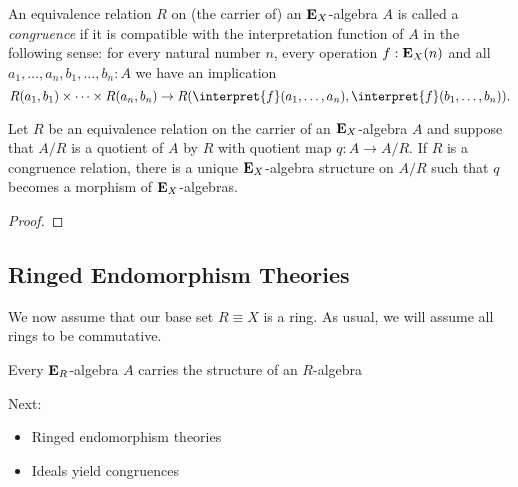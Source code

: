 {\begin{definition}
  An equivalence relation \(R\) on (the carrier of) an \(\mathbf{E}_X\)-algebra \(A\) is called a \emph{congruence} if it is compatible with the interpretation function of \(A\) in the following sense:
  for every natural number \(n\), every operation \(f:\mathbf{E}_X(n)\) and all \(a_1,\dots,a_n,b_1,\dots,b_n : A\) we have an implication
  \[
    R(a_1,b_1) \times \dots\times R(a_n,b_n) \to R(\interpret{f}(a_1,\dots,a_n),\interpret{f}(b_1,\dots,b_n)).
  \]
\end{definition}

\begin{lemma}
  Let \(R\) be an equivalence relation on the carrier of an \(\mathbf{E}_X\)-algebra \(A\) and suppose that \(A/R\) is a quotient of \(A\) by \(R\) with quotient map \(q:A \to A/R\).
  If \(R\) is a congruence relation, there is a unique \(\mathbf{E}_X\)-algebra structure on \(A/R\) such that \(q\) becomes a morphism of \(\mathbf{E}_X\)-algebras.
\end{lemma}
\begin{proof}
\end{proof}


\subsection{Ringed Endomorphism Theories}

We now assume that our base set \(R\equiv X\) is a ring.
As usual, we will assume all rings to be commutative.


\begin{lemma}
  Every \(\mathbf{E}_R\)-algebra \(A\) carries the structure of an \(R\)-algebra
\end{lemma}

Next:
\begin{itemize}
  \item Ringed endomorphism theories
  \item Ideals yield congruences
\end{itemize}

}
